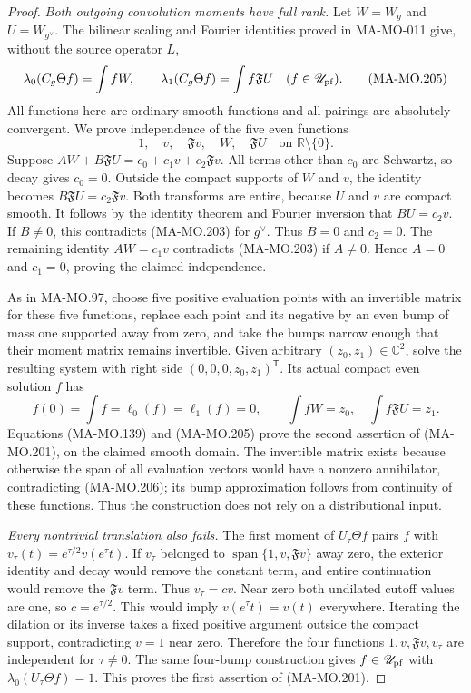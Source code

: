 \begin{proof}
\emph{Both outgoing convolution moments have full rank.}
Let \(W=W_g\) and \(U=W_{g^\vee}\). The bilinear
scaling and Fourier identities proved in MA-MO-011 give,
without the source operator \(L\),
\[
 \lambda_0(C_g\Theta f)=\int fW,\qquad
 \lambda_1(C_g\Theta f)=\int f\mathfrak FU
                        \quad(f\in\mathscr U_{\rm pf}).
 \tag{MA-MO.205}
\]
All functions here are ordinary smooth functions and all
pairings are absolutely convergent. We prove independence
of the five even functions
\[
                     1,\quad v,\quad\mathfrak Fv,
                              \quad W,\quad\mathfrak FU
                  \quad\text{on }\mathbb R\setminus\{0\}.
 \tag{MA-MO.206}
\]
Suppose \(A W+B\mathfrak FU=c_0+c_1v+c_2\mathfrak Fv\).
All terms other than \(c_0\) are Schwartz, so decay gives
\(c_0=0\). Outside the compact supports of \(W\) and
\(v\), the identity becomes
\(B\mathfrak FU=c_2\mathfrak Fv\). Both transforms
are entire, because \(U\) and \(v\) are compact smooth.
It follows by the identity theorem and Fourier inversion
that \(BU=c_2v\). If \(B\ne0\), this contradicts
(MA-MO.203) for \(g^\vee\). Thus \(B=0\) and
\(c_2=0\). The remaining identity \(AW=c_1v\)
contradicts (MA-MO.203) if \(A\ne0\). Hence \(A=0\)
and \(c_1=0\), proving the claimed independence.

As in MA-MO.97, choose five positive evaluation points
with an invertible matrix for these five functions,
replace each point and its negative by an even bump
of mass one supported away from zero, and take the
bumps narrow enough that their moment matrix remains
invertible. Given arbitrary \((z_0,z_1)\in\mathbb C^2\),
solve the resulting system with right side
\((0,0,0,z_0,z_1)^{\mathsf T}\). Its actual compact
even solution \(f\) has
\[
        f(0)=\int f=\ell_0(f)=\ell_1(f)=0,
                \qquad \int fW=z_0,\quad\int f\mathfrak FU=z_1.
 \tag{MA-MO.207}
\]
Equations (MA-MO.139) and (MA-MO.205) prove the second
assertion of (MA-MO.201), on the claimed smooth domain.
The invertible matrix exists because otherwise the span
of all evaluation vectors would have a nonzero annihilator,
contradicting (MA-MO.206); its bump approximation follows
from continuity of these functions. Thus the construction
does not rely on a distributional input.

\emph{Every nontrivial translation also fails.}
The first moment of \(U_\tau\Theta f\) pairs \(f\)
with \(v_\tau(t)=e^{\tau/2}v(e^\tau t)\).
If \(v_\tau\) belonged to
\(\operatorname{span}\{1,v,\mathfrak Fv\}\) away zero,
the exterior identity and decay would remove the constant
term, and entire continuation would remove the
\(\mathfrak Fv\) term. Thus \(v_\tau=c v\).
Near zero both undilated cutoff values are one, so
\(c=e^{\tau/2}\). This would imply
\(v(e^\tau t)=v(t)\) everywhere. Iterating the dilation
or its inverse takes a fixed positive argument outside
the compact support, contradicting \(v=1\) near zero.
Therefore the four functions \(1,v,\mathfrak Fv,v_\tau\)
are independent for \(\tau\ne0\). The same four-bump
construction gives \(f\in\mathscr U_{\rm pf}\) with
\(\lambda_0(U_\tau\Theta f)=1\). This proves the first
assertion of (MA-MO.201).


\end{proof}
